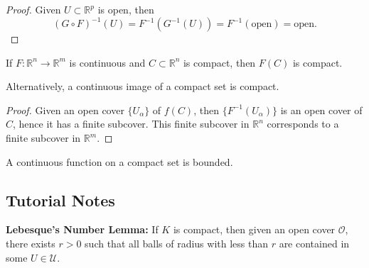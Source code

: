 \begin{itemize}
\begin{theorem}
              \begin{proof}
                  Given $U\subset \mathbb{R}^p$ is open, then
                  \begin{equation}
                      (G\circ F)^{-1}(U) = F^{-1}(G^{-1}(U)) = F^{-1}(\text{open}) = \text{open.}
                  \end{equation}
              \end{proof}
          \end{theorem}
          \begin{theorem}
              If $F:\mathbb{R}^n\rightarrow \mathbb{R}^m$ is continuous and $C\subset \mathbb{R}^n$ is compact, then $F(C)$ is compact.
              \vspace{2mm}

              Alternatively, a continuous image of a compact set is compact.
          \end{theorem}
          \begin{proof}
              Given an open cover $\{U_\alpha\}$ of $f(C)$, then $\{F^{-1}(U_\alpha)\}$ is an open cover of $C$, hence it has a finite subcover. This finite subcover in $\mathbb{R}^n$ corresponds to a finite subcover in $\mathbb{R}^m$.
          \end{proof}
          \begin{corollary}
              A continuous function on a compact set is bounded.
          \end{corollary}
        \subsection{Tutorial Notes}
        \begin{theorem}
            \textbf{Lebesque's Number Lemma:} If $K$ is compact, then given an open cover $\mathcal{O}$, there exists $r>0$ such that all balls of radius with less than $r$ are contained in some $U \in \mathcal{U}.$
        \end{theorem}
\end{itemize}
